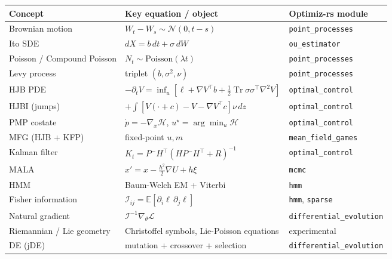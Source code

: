 \documentclass[11pt,a4paper]{article}
\begin{document}
{\def\LTcaptype{none} %
\begin{longtable}[]{@{}
  >{\raggedright\arraybackslash}p{}
  >{\raggedright\arraybackslash}p{}
  >{\raggedright\arraybackslash}p{}@{}}
\toprule\noalign{}
\begin{minipage}[b]{\linewidth}\raggedright
Concept
\end{minipage} & \begin{minipage}[b]{\linewidth}\raggedright
Key equation / object
\end{minipage} & \begin{minipage}[b]{\linewidth}\raggedright
Optimiz-rs module
\end{minipage} \\
\midrule\noalign{}
\endhead
\bottomrule\noalign{}
\endlastfoot
Brownian motion & \(W_t - W_s \sim \mathcal{N}(0,t-s)\) & \texttt{point\_processes} \\
Ito SDE & \(dX=b\,dt+\sigma\,dW\) & \texttt{ou\_estimator} \\
Poisson / Compound Poisson & \(N_t\sim\text{Poisson}(\lambda t)\) & \texttt{point\_processes} \\
Levy process & triplet \((b,\sigma^2,\nu)\) & \texttt{point\_processes} \\
HJB PDE & \(-\partial_t V = \inf_u[\ell + \nabla V^\top b + \tfrac12\operatorname{Tr}\sigma\sigma^\top\nabla^2 V]\) & \texttt{optimal\_control} \\
HJBI (jumps) & \(+\int[V(\cdot+c)-V-\nabla V^\top c]\nu\,dz\) & \texttt{optimal\_control} \\
PMP costate & \(\dot p = -\nabla_x\mathcal{H}\), \(u^\star=\arg\min_u\mathcal{H}\) & \texttt{optimal\_control} \\
MFG (HJB + KFP) & fixed-point \(u,m\) & \texttt{mean\_field\_games} \\
Kalman filter & \(K_t = P^-H^\top(HP^-H^\top+R)^{-1}\) & \texttt{optimal\_control} \\
MALA & \(x'=x-\tfrac{h^2}{2}\nabla U+h\xi\) & \texttt{mcmc} \\
HMM & Baum-Welch EM + Viterbi & \texttt{hmm} \\
Fisher information & \(\mathcal{I}_{ij}=\mathbb{E}[\partial_i\ell\,\partial_j\ell]\) & \texttt{hmm}, \texttt{sparse} \\
Natural gradient & \(\mathcal{I}^{-1}\nabla_\theta\mathcal{L}\) & \texttt{differential\_evolution} \\
Riemannian / Lie geometry & Christoffel symbols, Lie-Poisson equations & experimental \\
DE (jDE) & mutation + crossover + selection & \texttt{differential\_evolution} \\
\end{longtable}
}
\end{document}
